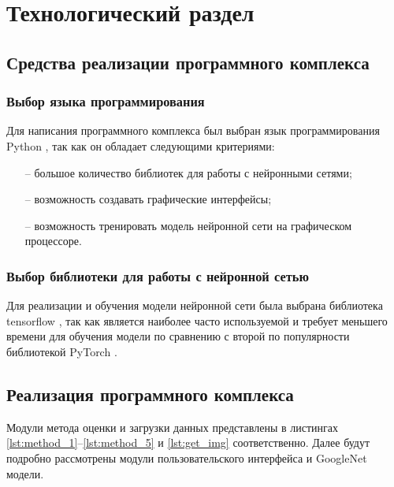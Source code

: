 \section{Технологический раздел}
\subsection{Средства реализации программного комплекса}
\subsubsection*{Выбор языка программирования}
Для написания программного комплекса  был выбран язык программирования Python \cite{python}, так как он обладает следующими критериями:
\begin{itemize}[leftmargin=1.6\parindent]
	\item[--] большое количество библиотек для работы с нейронными сетями;
	\item[--] возможность создавать графические интерфейсы;
	\item[--] возможность тренировать модель нейронной сети на графическом процессоре.
\end{itemize}

\subsubsection*{Выбор библиотеки для работы с нейронной сетью}
Для реализации и обучения модели нейронной сети была выбрана библиотека tensorflow \cite{tensorflow}, так как является наиболее часто используемой и требует меньшего времени для обучения модели по сравнению с второй по популярности библиотекой PyTorch \cite{tensorflow_pytorch}.

\subsection{Реализация программного комплекса}
Модули метода оценки и загрузки данных представлены в листингах \ref{lst:method_1}--\ref{lst:method_5} и \ref{lst:get_img} соответственно. Далее будут подробно рассмотрены модули пользовательского интерфейса и GoogleNet модели.

